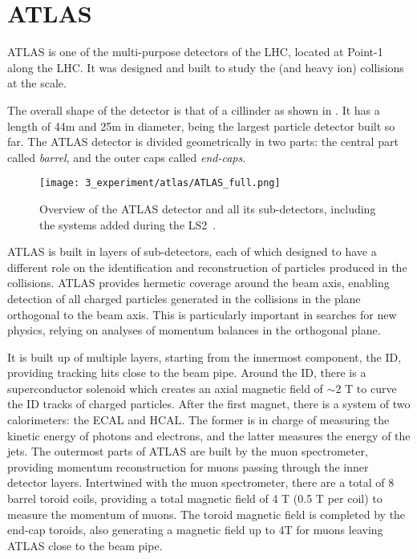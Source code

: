 \FloatBarrier
\section{ATLAS}
\label{sec:atlas:atlas}

\ac{ATLAS} is one of the multi-purpose detectors of the \ac{LHC}, located at Point-1 along the \ac{LHC}. It was designed and built to study the \pp (and heavy ion) collisions at the \tev scale.

The overall shape of the detector is that of a cillinder as shown in \Fig{\ref{fig:atlas:atlas:atlas}}. It has a length of 44m and 25m in diameter, being the largest particle detector built so far. The \ac{ATLAS} detector is divided geometrically in two parts: the central part called \textit{barrel}, and the outer caps called \textit{end-caps}.

\begin{figure}[ht!]
    \centering
    \texttt{[image: 3\_experiment/atlas/ATLAS\_full.png]}
    \caption{Overview of the \ac{ATLAS} detector and all its sub-detectors, including the systems added during the \ac{LS2}~\cite{ATLAS-Diagram}.}
    \label{fig:atlas:atlas:atlas}
\end{figure}

\ac{ATLAS} is built in layers of sub-detectors, each of which designed to have a different role on the identification and reconstruction of particles produced in the collisions. \ac{ATLAS} provides hermetic coverage around the beam axis, enabling detection of all charged particles generated in the collisions in the plane orthogonal to the beam axis. This is particularly important in searches for new physics, relying on analyses of momentum balances in the orthogonal plane.

It is built up of multiple layers, starting from the innermost component, the \acf{ID}, providing tracking hits close to the beam pipe. Around the \ac{ID}, there is a superconductor solenoid which creates an axial magnetic field of \(\sim 2\) T to curve the \ac{ID} tracks of charged particles.
After the first magnet, there is a system of two calorimeters: the \ac{ECAL} and \ac{HCAL}. The former is in charge of measuring the kinetic energy of photons and electrons, and the latter measures the energy of the jets.
The outermost parts of \ac{ATLAS} are built by the muon spectrometer, providing momentum reconstruction for muons passing through the inner detector layers. Intertwined with the muon spectrometer, there are a total of 8 barrel toroid coils, providing a total magnetic field of 4 T (0.5 T per coil) to measure the momentum of muons. The toroid magnetic field is completed by the end-cap toroids,  also generating a magnetic field up to 4T for muons leaving \ac{ATLAS} close to the beam pipe.

